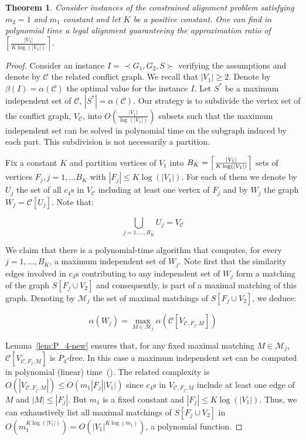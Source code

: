 \documentclass[final]{dmtcs-episciences}
\newcommand*{\Union}{\bigcup}
\newtheorem{theorem}{Theorem}
\newcommand\mar[1]{\textcolor{black}{#1}}
\begin{document}
\begin{theorem}\label{th:approxlog}
Consider instances of the constrained alignment problem satisfying $m_2=1$ and $m_1$ constant and let $K$ be a positive constant. One can find in polynomial time a legal alignment guaranteeing the approximation ratio of $\left\lceil \frac{|V_1|}{K\log(|V_1|)}\right\rceil$.
\end{theorem}

\begin{proof}
Consider an instance $I=\prec G_1,G_2,S \succ$ verifying the assumptions and denote by $\mathcal{C}$ the related conflict graph. We recall that $|V_1|\geq 2$. Denote by $\beta(I)=\alpha(\mathcal{C})$ the optimal value for the instance $I$.
Let $S^*$ be a maximum independent set of $\mathcal{C}$, $|S^*|=\alpha(\mathcal{C})$. 
Our strategy is to subdivide the vertex set of the conflict graph, $V_{\mathcal{C}}$, into $O\left(\frac{|V_1|}{\log(|V_1|)}\right)$ subsets such that the maximum independent set can be solved in polynomial time on the subgraph induced by each part. This subdivision is not necessarily a partition.

Fix a constant $K$ and partition vertices of $V_1$
 into $\mar{B_K}=\left\lceil \frac{|V_1|}{K\log(|V_1|)}\right\rceil$ sets of vertices $F_{j}, j=1, \ldots B_K$  with $|F_{j}|\leq  K\log(|V_1|)$. For each of them we denote by  $U_{j}$ the set of all $c_4$s in $V_{\mathcal{C}}$ including at least one vertex of  $F_{j}$ and by $W_{j}$ the graph $W_{j}=\mathcal{C}[U_{j}]$. Note that: 
 
 \begin{equation}\label{eq:union}
 \Union\limits_{j=1, \ldots, B_K} U_j= V_{\mathcal{C}}
 \end{equation}

We claim that there is a polynomial-time algorithm that computes, for every $j=1, \ldots, B_K$, a maximum independent set of $W_j$.  
Note first that the similarity edges involved in $c_4$s contributing to any independent set of $W_j$ form a matching of the graph $S[F_j\cup V_2]$ and consequently, is part of a maximal matching of this graph. Denoting by $\mathcal{M}_j$ the set of maximal matchings of $S[F_j\cup V_2]$, we deduce:

\begin{equation}\label{eq:maxstable}
 \alpha(W_j)=\max\limits_{M\in \mathcal{M}_j}\alpha(\mathcal{C}[V_{\mathcal{C},F_j,M}])
 \end{equation}

Lemma~\ref{lem:P_4-new} ensures that, for any fixed maximal matching $M\in \mathcal{M}_j$, $\mathcal{C}[V_{\mathcal{C},F_j,M}]$ is $P_4$-free. In this case a maximum independent set can be computed in polynomial (linear) time~(\citet{golumbicbook}). The related complexity is $O(|V_{\mathcal{C},F_j,M}|)\leq O(m_1|F_j||V_1|)$ since $c_4$s in $V_{\mathcal{C},F_j,M}$ include at least one edge of $M$ and $|M|\leq |F_j|$.  But $m_1$ is a fixed constant and $|F_{j}|\leq  K\log(|V_1|)$. Thus, we can exhaustively list all maximal matchings of $S[F_j\cup V_2]$ in $O\left( m_1^{K\log(|V_1|)} \right)=O\left( |V_1|^{K\log(m_1)} \right)$, a polynomial function.  


\end{proof}
\end{document}
